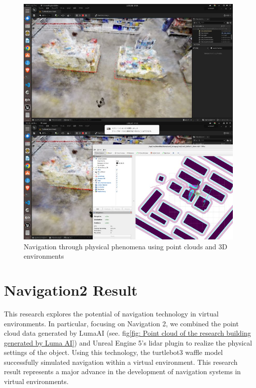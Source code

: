 \begin{figure}[htbp]
  \centering
  \includegraphics[scale=0.5]{./Figure/n.jpg}
  \caption{Navigation through physical phenomena using point clouds and 3D environments}
  \label{fig:Navigation through physical phenomena using point clouds and 3D environments}
\end{figure}
\section{Navigation2 Result}
\label{sec:Navigation2Result}
This research explores the potential of navigation technology in virtual environments. In particular, focusing on Navigation 2, we combined the point cloud data generated by LumaAI (see. fig\ref{fig: Point cloud of the research building generated by Luma AI}) and Unreal Engine 5's lidar plugin\cite{unrealengine_lidar_plugin} to realize the physical settings of the object. Using this technology, the turtlebot3 waffle model successfully simulated navigation within a virtual environment. This research result represents a major advance in the development of navigation systems in virtual environments.

